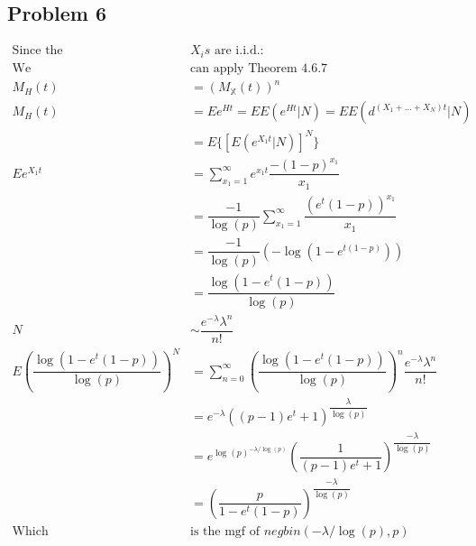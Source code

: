 \documentclass{article}
\begin{document}
\begin{flushleft}
\section*{Problem 6}
\begin{align*}
\text{Since the } &X_is \text{ are i.i.d.:}\\
\text{We }&\text{can apply Theorem 4.6.7}\\
M_H(t)&=(M_{\mathbb{X}}(t))^n \\
M_H(t)&= Ee^{Ht}=EE(e^{Ht}|N)=EE(d^{(X_1+\dots+X_N)t}|N)\\
&=E\{[E(e^{X_1t}|N)]^N\}\\
Ee^{X_1t}&=\sum_{x_1=1}^{\infty}e^{x_1t}\dfrac{-(1-p)^{x_1}}{x_1}\\
&=\dfrac{-1}{\log(p)}\sum_{x_1=1}^{\infty}\dfrac{(e^{t}(1-p))^{x_1}}{x_1}\\
&=\dfrac{-1}{\log(p)}(-\log(1-e^{t(1-p)}))\\
&=\dfrac{\log(1-e^t(1-p))}{\log(p)}\\
N&\sim \dfrac{e^{-\lambda} \lambda^n}{n!}\\
E(\dfrac{\log(1-e^t(1-p))}{\log(p)})^N&=\sum_{n=0}^{\infty}(\dfrac{\log(1-e^t(1-p))}{\log(p)})^n\dfrac{e^{-\lambda} \lambda^n}{n!}\\
&=e^{-\lambda}((p-1)e^t+1)^{\dfrac{\lambda}{\log(p)}}\\
&=e^{\log(p)^{-\lambda/\log(p)}}\left(\dfrac{1}{(p-1)e^t+1}\right)^{\dfrac{-\lambda}{\log(p)}}\\
&=\left(\dfrac{p}{1-e^t(1-p)}\right)^{\dfrac{-\lambda}{\log(p)}}\\
\text{Which }& \text{is the mgf of } negbin(-\lambda/\log(p),p)\\
\end{align*}
\pagebreak

\end{flushleft}
\end{document}
